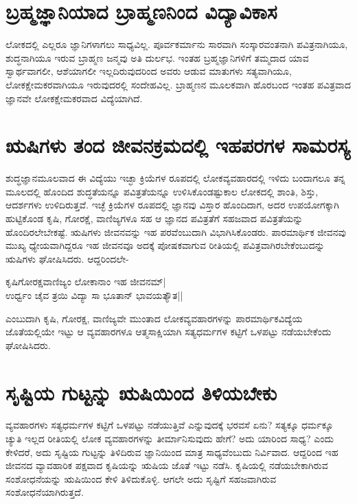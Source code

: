 \section*{ಬ್ರಹ್ಮಜ್ಞಾನಿಯಾದ ಬ್ರಾಹ್ಮ‌ಣನಿಂದ ವಿದ್ಯಾವಿಕಾಸ}

ಲೋಕದಲ್ಲಿ ಎಲ್ಲರೂ ಜ್ಞಾನಿಗಳಾಗಲು ಸಾಧ್ಯವಿಲ್ಲ. ಪೂರ್ವಕರ್ಮಾನು ಸಾರವಾಗಿ ಸಂಸ್ಕಾರವಂತನಾಗಿ ಪವಿತ್ರನಾಗಿಯೂ, ಶುದ್ಧನಾಗಿಯೂ ಇರುವ ಬ್ರಾಹ್ಮಣ ಜನ್ಮವು ಅತಿ ದುರ್ಲಭ. ಇಂತಹ ಬ್ರಹ್ಮಜ್ಞಾನಿಗಳಿಗೆ ತಮ್ಮದಾದ ಯಾವ ಸ್ವಾರ್ಥವಾಗಲೀ, ಆಶೆಯಾಗಲೀ ಇಲ್ಲದಿರುವುದರಿಂದ ಅವರು ಆಡುವ ಮಾತುಗಳು ಸತ್ಯವಾಗಿಯೂ, ಲೋಕಕ್ಷೇಮಕರವಾಗಿಯೂ ಇರುವುದರಲ್ಲಿ ಸಂದೇಹವಿಲ್ಲ. ಬ್ರಾಹ್ಮಣನ ಮೂಲಕವಾಗಿ ಹೊರಬಂದ ಇಂತಹ ಪವಿತ್ರವಾದ ಜ್ಞಾನವೇ ಲೋಕಕ್ಷೇಮಕರವಾದ ವಿದ್ಯೆಯಾಗಿದೆ.

\section*{ಋಷಿಗಳು ತಂದ ಜೀವನಕ್ರಮದಲ್ಲಿ ಇಹಪರಗಳ ಸಾಮರಸ್ಯ}

ಶುದ್ಧಜ್ಞಾನಮೂಲವಾದ ಈ ವಿದ್ಯೆಯು ಇಚ್ಛಾ ಕ್ರಿಯೆಗಳ ರೂಪದಲ್ಲಿ ಲೋಕವ್ಯವಹಾರದಲ್ಲಿ ಇಳಿದು ಬಂದಾಗಲೂ ತನ್ನ ಮೂಲದಲ್ಲಿ ಹೊಂದಿದ ಶುದ್ಧತೆಯನ್ನೂ ಪವಿತ್ರತೆಯನ್ನೂ ಉಳಿಸಿಕೊಂಡಷ್ಟುಕಾಲ ಲೋಕದಲ್ಲಿ ಶಾಂತಿ, ಶಿಸ್ತು, ಆದರ್ಶಗಳು ಉಳಿದಿರುತ್ತವೆ. ಇಚ್ಛೆ ಕ್ರಿಯೆಗಳ ರೂಪದಲ್ಲಿ ಜ್ಞಾನವು ವಿಸ್ತಾರ ಹೊಂದಿದಾಗ, ಅದರ ಉಪಯೋಗಕ್ಕಾಗಿ ಹುಟ್ಟಿಕೊಂಡ ಕೃಷಿ, ಗೋರಕ್ಷೆ, ವಾಣಿಜ್ಯಗಳೂ ಸಹ ಆ ಜ್ಞಾನದ ಪವಿತ್ರತೆಗೆ ಸಹಜವಾದ ಪವಿತ್ರತೆಯನ್ನು ಹೊಂದಿರಲೇಬೇಕಷ್ಟೆ. ಋಷಿಗಳು ಜೀವನವನ್ನು ಇಹ ಪರವೆಂಬುದಾಗಿ ವಿಭಾಗಿಸಿಕೊಂಡರು. ಪಾರಮಾರ್ಥಿಕ ಜೀವನವು ಮುಖ್ಯ ಧ್ಯೇಯವಾಗಿದ್ದರೂ ಇಹ ಜೀವನವೂ ಅದಕ್ಕೆ ಪೋಷಕವಾಗುವ ರೀತಿಯಲ್ಲಿ ಪವಿತ್ರವಾಗಿರಬೇಕೆಂಬುದನ್ನು ಋಷಿಗಳು ಘೋಷಿಸಿದರು. ಆದ್ದರಿಂದಲೇ-

\begin{shloka}
ಕೃಷಿಗೋರಕ್ಷವಾಣಿಜ್ಯಂ ಲೋಕಾನಾಂ ಇಹ ಜೀವನಮ್|\label{75}\\
ಉರ್ಧ್ವಂ ಚೈವ ತ್ರಯಿ ವಿದ್ಯಾ ಸಾ ಭೂತಾನ್ ಭಾವಯತ್ಯೌತ||
\end{shloka}

ಎಂಬುದಾಗಿ ಕೃಷಿ, ಗೋರಕ್ಷ, ವಾಣಿಜ್ಯವೇ ಮುಂತಾದ ಲೋಕವ್ಯವಹಾರಗಳನ್ನು ಪಾರಮಾರ್ಥಿಕವಿದ್ಯೆಯ ಜೊತೆಯಲ್ಲಿಯೇ ಇಟ್ಟು ಆ ವ್ಯವಹಾರಗಳೂ ಆತ್ಮಸಾಕ್ಷಿಯಾಗಿ ಸತ್ಯಧರ್ಮಗಳ ಕಟ್ಟಿಗೆ ಒಳಪಟ್ಟು ನಡೆಯಬೇಕೆಂದು ಘೋಷಿಸಿದರು.

\section*{ಸೃಷ್ಟಿಯ ಗುಟ್ಟನ್ನು ಋಷಿಯಿಂದ ತಿಳಿಯಬೇಕು}

ವ್ಯವಹಾರಗಳು ಸತ್ಯಧರ್ಮಗಳ ಕಟ್ಟಿಗೆ ಒಳಪಟ್ಟು ನಡೆಯುತ್ತಿವೆ ಎನ್ನುವುದಕ್ಕೆ ಭರವಸೆ ಏನು? ಸತ್ಯಕ್ಕೂ ಧರ್ಮಕ್ಕೂ ಚ್ಯುತಿ ಇಲ್ಲದ ರೀತಿಯಲ್ಲಿ ಲೋಕ ವ್ಯವಹಾರಗಳನ್ನು ತೀರ್ಮಾನಿಸುವುದು ಹೇಗೆ? ಅದು ಯಾರಿಂದ ಸಾಧ್ಯ? ಎಂದು ಕೇಳಿದರೆ, ಅದು ಸೃಷ್ಟಿಯ ಗುಟ್ಟನ್ನು ತಿಳಿದಿರುವ ಜ್ಞಾನಿಯಿಂದ ಮಾತ್ರ ಸಾಧ್ಯವೆಂಬುದು ನಿರ್ವಿವಾದ. ಆದ್ದರಿಂದ ಇಹ ಜೀವನದ ವ್ಯಾವಹಾರಿಕ ಪಕ್ಷವಾದ ಕೃಷಿಯನ್ನು ಋಷಿಯ ಜೊತೆ ಇಟ್ಟು ನಡೆಸಿ. ಕೃಷಿಯಲ್ಲಿ ನಡೆಯಬೇಕಾಗಿರುವ ಸಂಶೋಧನೆಯನ್ನು ಋಷಿಯಿಂದ ಕೇಳಿ ತಿಳಿದುಕೊಳ್ಳಿ. ಆಗಲೇ ಅದು ಸೃಷ್ಟಿಗೆ ಸಹಜವಾಗಿರುವ ಸಂಶೋಧನೆಯಾಗಿರುತ್ತದೆ.

